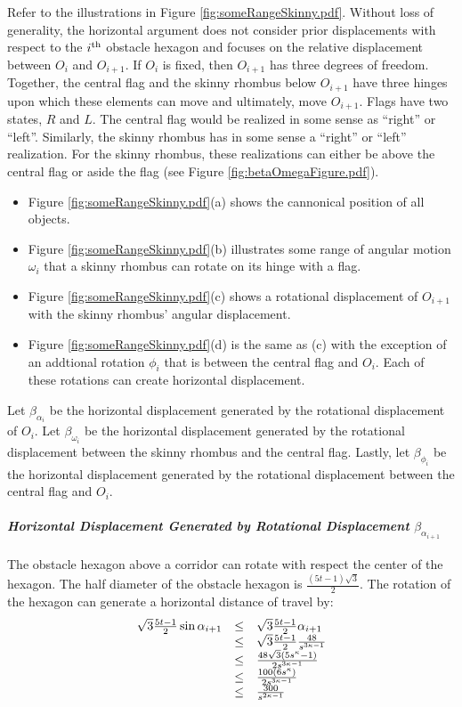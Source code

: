 Refer to the illustrations in Figure \ref{fig:someRangeSkinny.pdf}.  
Without loss of generality, the horizontal argument does not consider prior displacements with respect to the $i^\text{th}$ obstacle hexagon and focuses on the relative displacement between $O_{i}$ and $O_{i+1}$.  
If $O_i$ is fixed, then $O_{i+1}$ has three degrees of freedom.  
Together, the central flag and the skinny rhombus below $O_{i+1}$ have three hinges upon which these elements can move and ultimately, move $O_{i+1}$.  
Flags have two states, $R$ and $L$.  
The central flag would be realized in some sense as ``right'' or ``left''.   
Similarly, the skinny rhombus has in some sense a ``right'' or ``left'' realization.  
For the skinny rhombus, these realizations can either be above the central flag  or aside the flag (see Figure \ref{fig:betaOmegaFigure.pdf}).  
\begin{itemize}
\item Figure \ref{fig:someRangeSkinny.pdf}(a) shows the cannonical position of all objects.  
\item Figure \ref{fig:someRangeSkinny.pdf}(b) illustrates some range of angular motion $\omega_i$ that a skinny rhombus can rotate on its hinge with a flag.  
\item Figure \ref{fig:someRangeSkinny.pdf}(c) shows a rotational displacement of $O_{i+1}$ with the skinny rhombus' angular displacement.
\item Figure \ref{fig:someRangeSkinny.pdf}(d) is the same as (c) with the exception of an addtional rotation $\phi_i$ that is between the central flag and $O_i$.  
Each of these rotations can create horizontal displacement.  
\end{itemize}
Let $\beta_{\alpha_i}$ be the horizontal displacement generated by the rotational displacement of $O_i$.  
Let $\beta_{\omega_i}$ be the horizontal displacement generated by the rotational displacement between the skinny rhombus and the central flag.  
Lastly, let $\beta_{\phi_i}$ be the horizontal displacement generated by the rotational displacement between the central flag and $O_i$.
\paragraph{\textit{Horizontal Displacement Generated by Rotational Displacement} $\beta_{\alpha_{i+1}}$}
The obstacle hexagon above a corridor can rotate with respect the center of the hexagon.  
The half diameter of the obstacle hexagon is $ \frac{(5t-1)\sqrt{3}}{2}$.  
The rotation of the hexagon can generate a horizontal distance of travel by:
\begin{equation}
\begin{array}{rcl}
\sqrt{3} \frac{5t-1}{2} \sin \alpha_{i+1} &\leq&\sqrt{3} \frac{5t-1}{2}  \alpha_{i+1} \\
&\leq& \sqrt{3} \frac{5t-1}{2}  \frac{48}{s^{3\kappa-1}}\\
&\leq& \frac{48 \sqrt{3} \left( 5s^\kappa - 1 \right)}{2s^{3\kappa-1}}\\
&\leq& \frac{100 \left( 6s^\kappa \right)}{2s^{3\kappa-1}}\\
&\leq& \frac{300}{s^{2\kappa-1}}\\
\end{array}
\end{equation}

